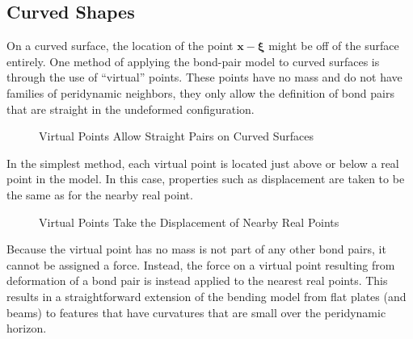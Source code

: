 \subsection{Curved Shapes}
On a curved surface, the location of the point $\mathbf{x} - \boldsymbol{\xi}$ might be off of the surface entirely.
One method of applying the bond-pair model to curved surfaces is through the use of ``virtual'' points.
These points have no mass and do not have families of peridynamic neighbors, they only allow the definition of bond pairs that are straight in the undeformed configuration.
%
\begin{figure}[tbp]
  \centering
  
  \caption{Virtual Points Allow Straight Pairs on Curved Surfaces}
  \label{fig:virtualPair}
\end{figure}
%
In the simplest method, each virtual point is located just above or below a real point in the model.
In this case, properties such as displacement are taken to be the same as for the nearby real point.
%
\begin{figure}[tbp]
  \centering
  
  \caption{Virtual Points Take the Displacement of Nearby Real Points}
  \label{fig:virtualPairDeformed}
\end{figure}
%
Because the virtual point has no mass is not part of any other bond pairs, it cannot be assigned a force. 
Instead, the force on a virtual point resulting from deformation of a bond pair is instead applied to the nearest real points.
This results in a straightforward extension of the bending model from flat plates (and beams) to features that have curvatures that are small over the peridynamic horizon.

